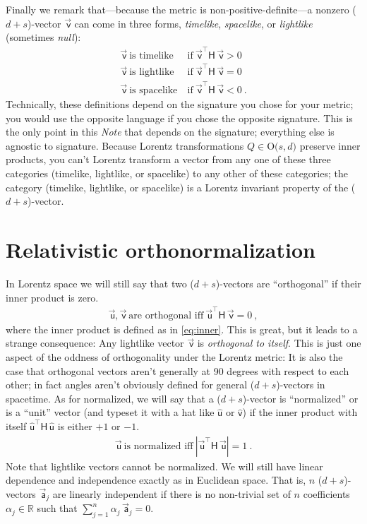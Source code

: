 \documentclass{article}
\newcommand{\metric}{\mathsf{H}}
\newcommand\upvec[1]{\!\vec{\,\mathrm{#1}}}
\newcommand{\Lvec}[1]{\upvec{\mathsf{#1}}} %
\newcommand{\Lhat}[1]{\hat{\mathsf{#1}}} %
\newcommand{\plus}{\!+\!} %
\newcommand{\documentname}{\textsl{Note}}
\begin{document}
Finally we remark that---because the metric is non-positive-definite---a nonzero ($d\plus s$)-vector $\Lvec{v}$ can come in three forms, \emph{timelike}, \emph{spacelike}, or \emph{lightlike} (sometimes \emph{null}):
\begin{align}
    \Lvec{v} ~ \mbox{is timelike}  &~ \mbox{if} ~ \Lvec{v}^\top\metric\,\Lvec{v} > 0 \label{eq:timelike}\\
    \Lvec{v} ~ \mbox{is lightlike} &~ \mbox{if} ~ \Lvec{v}^\top\metric\,\Lvec{v} = 0 \label{eq:lightlike}\\
    \Lvec{v} ~ \mbox{is spacelike} &~ \mbox{if} ~ \Lvec{v}^\top\metric\,\Lvec{v} < 0 ~.\label{eq:spacelike}
\end{align}
Technically, these definitions depend on the signature you chose for your metric; you would use the opposite language if you chose the opposite signature.
This is the only point in this \documentname{} that depends on the signature; everything else is agnostic to signature.
Because Lorentz transformations $Q\in\mbox{O($s,d$)}$ preserve inner products, you can't Lorentz transform a vector from any one of these three categories (timelike, lightlike, or spacelike) to any other of these categories; the category (timelike, lightlike, or spacelike) is a Lorentz invariant property of the ($d\plus s$)-vector.

\section{Relativistic orthonormalization}\label{sec:orth}

In Lorentz space we will still say that two ($d\plus s$)-vectors are ``orthogonal'' if their inner product is zero.
\begin{align}
    \Lvec{u},\Lvec{v} ~ \mbox{are orthogonal iff} ~ \Lvec{u}^\top\metric\,\Lvec{v}=0 ~,
\end{align}
where the inner product is defined as in \eqref{eq:inner}.
This is great, but it leads to a strange consequence:
Any lightlike vector $\Lvec{v}$ is \emph{orthogonal to itself}.
This is just one aspect of the oddness of orthogonality under the Lorentz metric:
It is also the case that orthogonal vectors aren't generally at 90 degrees with respect to each other; in fact angles aren't obviously defined for general ($d\plus s$)-vectors in spacetime.
As for normalized, we will say that a ($d\plus s$)-vector is ``normalized'' or is a ``unit'' vector (and typeset it with a hat like $\Lhat{u}$ or $\Lhat{v}$) if the inner product with itself $\Lhat{u}^\top\metric\,\Lhat{u}$ is either $+1$ or $-1$.
\begin{align}
    \Lvec{u} ~ \mbox{is normalized iff} ~ |\Lvec{u}^\top\metric\,\Lvec{u}| = 1 ~.
\end{align}
Note that lightlike vectors cannot be normalized. We will still have linear dependence and independence exactly as in Euclidean space.
That is, $n$ ($d\plus s$)-vectors $\Lvec{a}_j$ are linearly independent if there is no non-trivial set of $n$ coefficients $\alpha_j\in\mathbb{R}$ such that $\sum_{j=1}^n \alpha_j\,\Lvec{a}_j = 0$.
\end{document}
